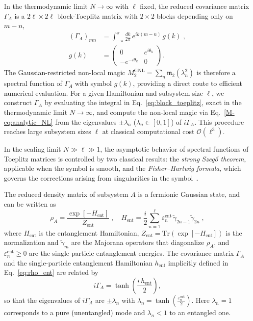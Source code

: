 \documentclass[aps,prl,twocolumn,superscriptaddress,reprint,longbibliography,nofootinbib]{revtex4-2}
\begin{document}
In the thermodynamic limit $N\to\infty$ with $\ell$ fixed, the reduced covariance matrix $\Gamma_A$ is a $2\ell\times 2\ell$ block-Toeplitz matrix with $2\times 2$ blocks depending only on $m-n$,
\begin{equation}
\begin{split}
    (\Gamma_A)_{mn} &= \int_{-\pi}^{\pi}\frac{dk}{2\pi}\,e^{ik(m-n)}\,g(k)\;,
    \\
    g(k) &= \begin{pmatrix} 0 & e^{i\theta_k} \\ -e^{-i\theta_k} & 0 \end{pmatrix}.
\end{split}
\label{eq:block_toeplitz}
\end{equation}
The Gaussian-restricted non-local magic $M_2^{\mathrm{GNL}} = \sum_n \mathfrak{m}_2(\lambda_n^2)$ is therefore a spectral function of $\Gamma_A$ with symbol $g(k)$, providing a direct route to efficient numerical evaluation.
For a given Hamiltonian and subsystem size $\ell$, we construct $\Gamma_A$ by evaluating the integral in Eq.~\eqref{eq:block_toeplitz}, exact in the thermodynamic limit $N\to\infty$, and compute the non-local magic via Eq.~\eqref{M-eq:analytic_NL} from the eigenvalues $\pm\lambda_n$ ($\lambda_n\in[0,1]$) of $i\Gamma_A$.
This procedure reaches large subsystem sizes $\ell$ at classical computational cost $\mathcal{O}(\ell^3)$.

In the scaling limit $N\gg \ell\gg 1$, the asymptotic behavior of spectral functions of Toeplitz matrices is controlled by two classical results: the \emph{strong Szeg\H{o} theorem}, applicable when the symbol is smooth, and the \emph{Fisher--Hartwig formula}, which governs the corrections arising from singularities in the symbol~\cite{Jin_2004,Its_2005}.

The reduced density matrix of subsystem $A$ is a fermionic Gaussian state, and can be written as~\cite{Peschel2004}
\begin{equation}
    \rho_A = \frac{\exp[{-H_{\mathrm{ent}}}]}{Z_{\mathrm{ent}}}\;, \quad H_{\mathrm{ent}} = \frac{i}{2}\sum_{n=1}^{\ell} \varepsilon_n^{\mathrm{ent}}\,\tilde\gamma_{2n-1}\tilde\gamma_{2n}\;,
    \label{eq:rho_ent}
\end{equation}
where $H_{\mathrm{ent}}$ is the entanglement Hamiltonian, $Z_{\mathrm{ent}}=\mathrm{Tr}(\exp[{-H_{\mathrm{ent}}}])$ is the normalization and $\tilde\gamma_m$ are the Majorana operators that diagonalize $\rho_A$, and $\varepsilon_n^{\mathrm{ent}} \geq 0$ are the single-particle entanglement energies.
The covariance matrix $\Gamma_A$ and the single-particle entanglement Hamiltonian $h_{\mathrm{ent}}$ implicitly defined in Eq.~\eqref{eq:rho_ent} are related by
\begin{equation}
    i\Gamma_A = \tanh\!\left(\frac{i\,h_{\mathrm{ent}}}{2}\right),
    \label{eq:Gamma_tanh}
\end{equation}
so that the eigenvalues of $i\Gamma_A$ are $\pm\lambda_n$ with $\lambda_n = \tanh\!\left(\frac{\varepsilon_n^{\mathrm{ent}}}{2}\right)$. 
Here $\lambda_n = 1$ corresponds to a pure (unentangled) mode and $\lambda_n < 1$ to an entangled one.
\end{document}
